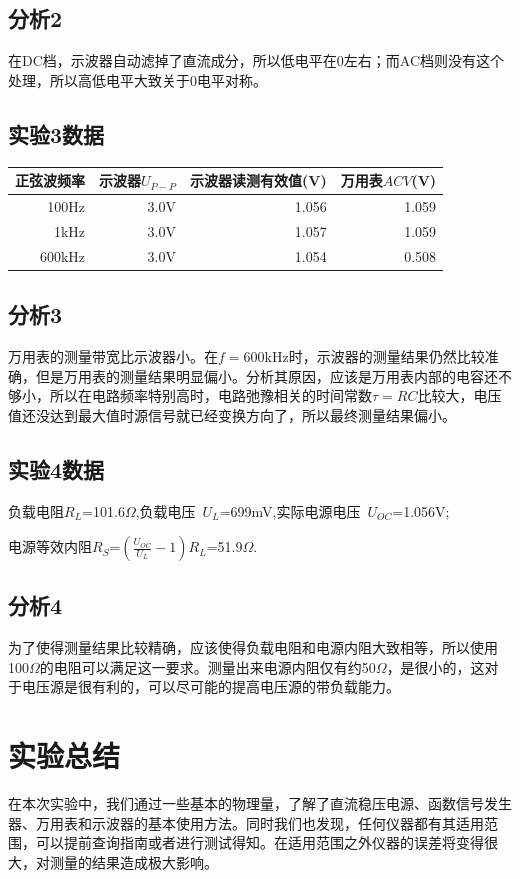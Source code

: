 \documentclass[a4paper,11pt,UTF8]{ctexart}
\begin{document}
\subsection{分析2}
	在DC档，示波器自动滤掉了直流成分，所以低电平在0左右；而AC档则没有这个处理，所以高低电平大致关于0电平对称。
\subsection{实验3数据}
	\begin{center}
	\begin{tabular}{|r|r|r|r|}\hline
	正弦波频率 & 示波器$U_{P-P}$ & 示波器读测有效值(V) & 万用表$ACV$(V)\\\hline
	100Hz & 3.0V & 1.056 & 1.059\\\hline
	1kHz & 3.0V & 1.057 & 1.059\\\hline
	600kHz & 3.0V & 1.054 & 0.508\\\hline
		\end{tabular}
		\end{center}
\subsection{分析3}
	万用表的测量带宽比示波器小。在$f=600$kHz时，示波器的测量结果仍然比较准确，但是万用表的测量结果明显偏小。分析其原因，应该是万用表内部的电容还不够小，所以在电路频率特别高时，电路弛豫相关的时间常数$\tau=RC$比较大，电压值还没达到最大值时源信号就已经变换方向了，所以最终测量结果偏小。
\subsection{实验4数据}
	负载电阻$R_L$=101.6$\Omega$,负载电压~$U_L$=699mV,实际电源电压~$U_{OC}$=1.056V;\par
	电源等效内阻$R_S$=$\left( \frac{U_{OC}}{U_L}-1 \right)R_L$=51.9$\Omega$.
\subsection{分析4}
	为了使得测量结果比较精确，应该使得负载电阻和电源内阻大致相等，所以使用100$\Omega$的电阻可以满足这一要求。测量出来电源内阻仅有约50$\Omega$，是很小的，这对于电压源是很有利的，可以尽可能的提高电压源的带负载能力。
\newpage
\section{实验总结}
	在本次实验中，我们通过一些基本的物理量，了解了直流稳压电源、函数信号发生器、万用表和示波器的基本使用方法。同时我们也发现，任何仪器都有其适用范围，可以提前查询指南或者进行测试得知。在适用范围之外仪器的误差将变得很大，对测量的结果造成极大影响。
\end{document}
